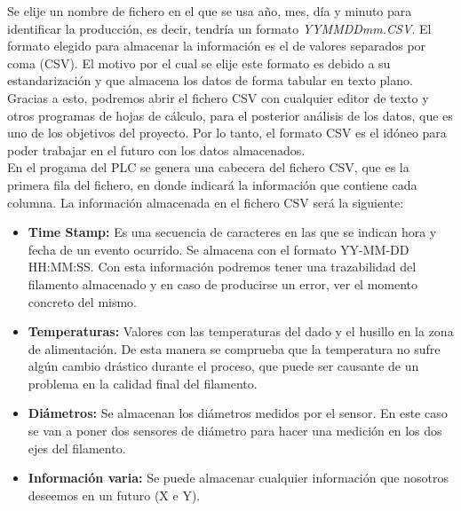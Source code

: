 Se elije un nombre de fichero en el que se usa año, mes, día y minuto para identificar la producción, es decir, tendría un formato \textit{YYMMDDmm.CSV}. El formato elegido para almacenar la información es el de valores separados por coma (CSV). El motivo por el cual se elije este formato es debido a su estandarización y que almacena los datos de forma tabular en texto plano. Gracias a esto, podremos abrir el fichero CSV con cualquier editor de texto y otros programas de hojas de cálculo, para el posterior análisis de los datos, que es uno de los objetivos del proyecto. Por lo tanto, el formato CSV es el idóneo para poder trabajar en el futuro con los datos almacenados.\\

En el progama del PLC se genera una cabecera del fichero CSV, que es la primera fila del fichero, en donde indicará la información que contiene cada columna. La información almacenada en el fichero CSV será la siguiente:

\begin{itemize}
    \item{\textbf{Time Stamp: }Es una secuencia de caracteres en las que se indican hora y fecha de un evento ocurrido. Se almacena con el  formato YY-MM-DD HH:MM:SS. Con esta información podremos tener una trazabilidad del filamento almacenado y en caso de producirse un error, ver el momento concreto del mismo.}
    \item{\textbf{Temperaturas: }Valores con las temperaturas del dado y el husillo en la zona de alimentación. De esta manera se comprueba que la temperatura no sufre algún cambio drástico durante el proceso, que puede ser causante de un problema en la calidad final del filamento.}
    \item{\textbf{Diámetros: }Se almacenan los diámetros medidos por el sensor. En este caso se van a poner dos sensores de diámetro para hacer una medición en los dos ejes del filamento.}
    \item{\textbf{Información varia: }Se puede almacenar cualquier información que nosotros deseemos en un futuro (X e Y).}
\end{itemize}

